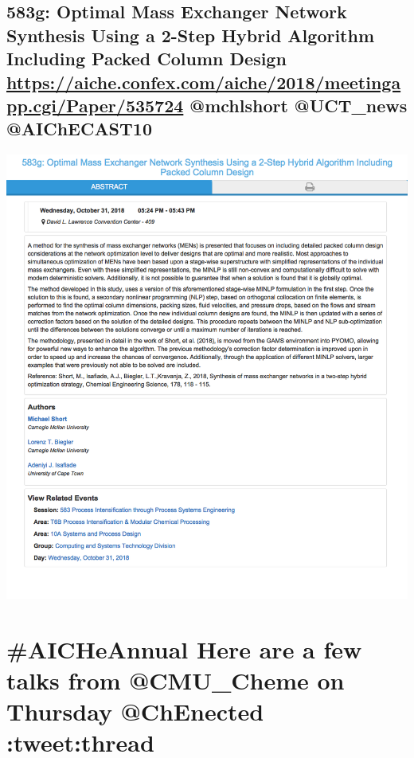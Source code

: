 \documentclass[11pt]{article}
\begin{document}
\subsection{583g: Optimal Mass Exchanger Network Synthesis Using a 2-Step Hybrid Algorithm Including Packed Column Design \url{https://aiche.confex.com/aiche/2018/meetingapp.cgi/Paper/535724} @mchlshort @UCT\_news ‏@AIChECAST10}
\label{sec:org04bb099}
\begin{center}
\includegraphics[width=.9\linewidth]{./535724.png}
\end{center}

\section{\#AICHeAnnual Here are a few talks from @CMU\_Cheme on Thursday @ChEnected :tweet:thread}
\label{sec:org8a1d993}
\end{document}
